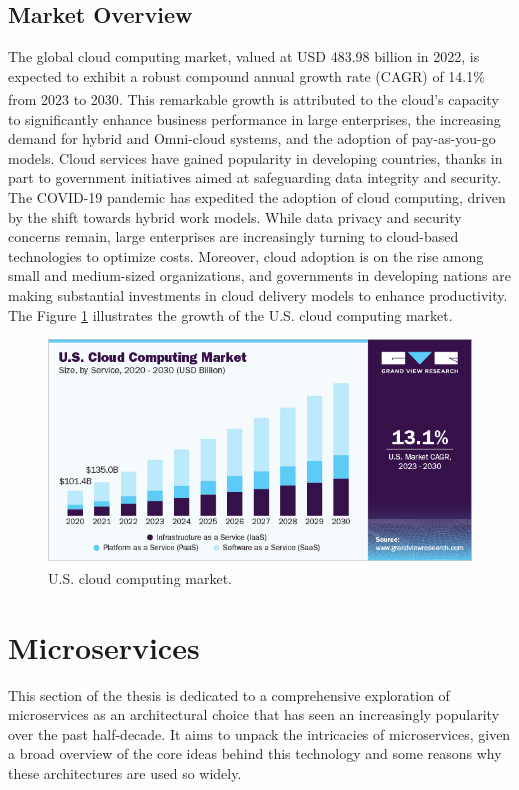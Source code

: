 \subsection{Market Overview}
The global cloud computing market, valued at USD 483.98 billion in 2022, is expected to exhibit a
robust compound annual growth rate (CAGR) of 14.1\% from 2023 to
2030\textsuperscript{\cite{market_cloud_computing}}. This remarkable growth is attributed to the
cloud's capacity to significantly enhance business performance in large enterprises, the increasing
demand for hybrid and Omni-cloud systems, and the adoption of pay-as-you-go models. Cloud services
have gained popularity in developing countries, thanks in part to government initiatives aimed at
safeguarding data integrity and security. The COVID-19 pandemic has expedited the adoption of cloud
computing, driven by the shift towards hybrid work models. While data privacy and security concerns
remain, large enterprises are increasingly turning to cloud-based technologies to optimize costs.
Moreover, cloud adoption is on the rise among small and medium-sized organizations, and governments
in developing nations are making substantial investments in cloud delivery models to enhance
productivity. The Figure \ref{fig:3_cloud_computing_market} illustrates the growth of the U.S. cloud
computing market.

\begin{figure}
    \centering
    \includegraphics[scale=0.5]{Pictures/3_cloud_computing_market.png}
    \caption{U.S. cloud computing market\textsuperscript{\cite{market_cloud_computing}}.}
    \label{fig:3_cloud_computing_market}
\end{figure}

\section{Microservices}
This section of the thesis is dedicated to a comprehensive exploration of microservices as an
architectural choice that has seen an increasingly popularity over the past half-decade. It aims to
unpack the intricacies of microservices, given a broad overview of the core ideas behind this technology and some
reasons why these architectures are used so widely.

